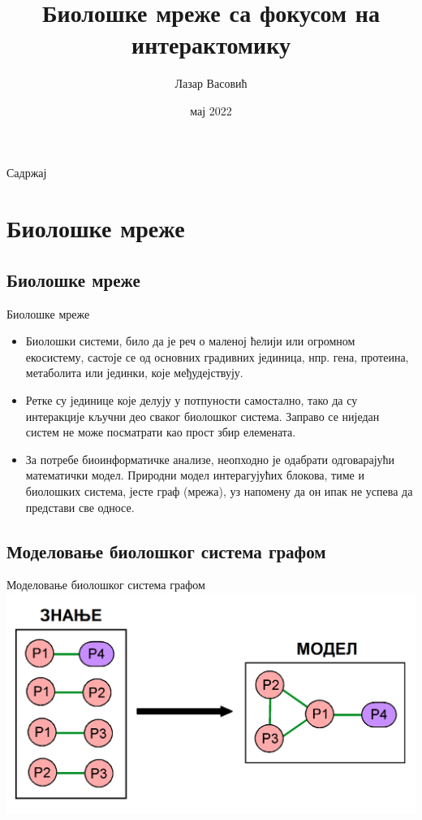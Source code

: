 \documentclass[hyperref={bookmarks=false}]{beamer}
\title[Интерактомика]{Биолошке мреже са фокусом на интерактомику}
\author{Лазар Васовић}
\institute[]{Математички факултет, Универзитет у Београду\\\url{https://github.com/matfija/Neuredjenost-u-interaktomu}}
\date[Математички факултет]{мај 2022}
\begin{document}
\frame{\titlepage}

\begin{frame}{Садржај}
\tableofcontents[subsectionstyle=hide]
\end{frame}

\section{Биолошке мреже}
\subsection{Биолошке мреже}
\begin{frame}{Биолошке мреже}
\begin{itemize}
	\item Биолошки системи, било да је реч о маленој ћелији или огромном екосистему, састоје се од основних градивних јединица, нпр. гена, протеина, метаболита или јединки, које међудејствују.

	\item Ретке су јединице које делују у потпуности самостално, тако да су интеракције кључни део сваког биолошког система. Заправо се ниједан систем не може посматрати као прост збир елемената.

	\item За потребе биоинформатичке анализе, неопходно је одабрати одговарајући математички модел. Природни модел интерагујућих блокова, тиме и биолошких система, јесте граф (мрежа), уз напомену да он ипак не успева да представи све односе.
\end{itemize}
\end{frame}

\subsection{Моделовање биолошког система графом}
\begin{frame}{Моделовање биолошког система графом}
\centering\includegraphics[width=.95\textwidth]{grafmod.png}
\end{frame}
\end{document}
